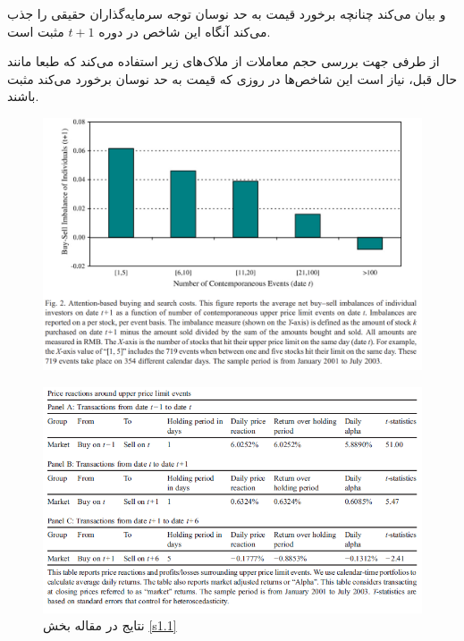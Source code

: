 \documentclass[12pt]{article}
\begin{document}
و بیان می‌کند چنانچه برخورد قیمت به حد نوسان توجه سرمایه‌گذاران حقیقی را جذب می‌کند آنگاه این شاخص در دوره $ t+1 $ مثبت است.

از طرفی جهت بررسی حجم معاملات از ملاک‌های زیر استفاده می‌کند که طبعا مانند حال قبل، نیاز است این شاخص‌ها در روزی که قیمت به حد نوسان برخورد می‌کند مثبت باشند.



\begin{figure}[htbp]
\centering
\includegraphics[width=\columnwidth]{g1.png}
\end{figure}
\FloatBarrier
\begin{figure}[htbp]
\includegraphics[width=\columnwidth]{Table4.png}
\caption{ نتایج  در مقاله بخش \ref {s1.1}}
\label{g2}
\end{figure}
\FloatBarrier
\end{document}
